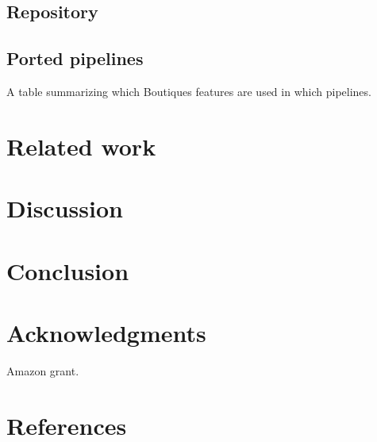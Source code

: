 \documentclass{article}
\begin{document}
\subsection{Repository}

\subsection{Ported pipelines}


A table summarizing which Boutiques features are used in which pipelines.

\section{Related work}


\section{Discussion}

\section{Conclusion}

\section{Acknowledgments}

Amazon grant.


\section{References}


\end{document}
